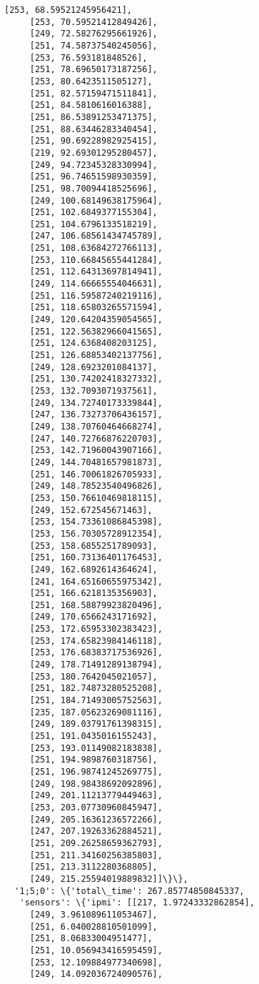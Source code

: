 \documentclass[11pt]{article}
\begin{document}
\begin{tcolorbox}[breakable, size=fbox, boxrule=.5pt, pad at break*=1mm, opacityfill=0]
\begin{Verbatim}[commandchars=\\\{\}]
     [253, 68.59521245956421],
     [253, 70.59521412849426],
     [249, 72.58276295661926],
     [251, 74.58737540245056],
     [253, 76.593181848526],
     [251, 78.69650173187256],
     [253, 80.6423511505127],
     [251, 82.57159471511841],
     [251, 84.5810616016388],
     [251, 86.53891253471375],
     [251, 88.63446283340454],
     [251, 90.69228982925415],
     [219, 92.69301295280457],
     [249, 94.72345328330994],
     [251, 96.74651598930359],
     [251, 98.70094418525696],
     [249, 100.68149638175964],
     [251, 102.6849377155304],
     [251, 104.6796133518219],
     [247, 106.68561434745789],
     [251, 108.63684272766113],
     [253, 110.66845655441284],
     [251, 112.64313697814941],
     [249, 114.66665554046631],
     [251, 116.59587240219116],
     [251, 118.65803265571594],
     [249, 120.64204359054565],
     [251, 122.56382966041565],
     [251, 124.6368408203125],
     [251, 126.68853402137756],
     [249, 128.6923201084137],
     [251, 130.74202418327332],
     [253, 132.7093071937561],
     [249, 134.72740173339844],
     [247, 136.73273706436157],
     [249, 138.70760464668274],
     [247, 140.72766876220703],
     [253, 142.71960043907166],
     [249, 144.70481657981873],
     [251, 146.70061826705933],
     [249, 148.78523540496826],
     [253, 150.76610469818115],
     [249, 152.672545671463],
     [253, 154.73361086845398],
     [253, 156.70305728912354],
     [253, 158.6855251789093],
     [251, 160.73136401176453],
     [249, 162.6892614364624],
     [241, 164.65160655975342],
     [251, 166.6218135356903],
     [251, 168.58879923820496],
     [249, 170.6566243171692],
     [253, 172.65953302383423],
     [253, 174.65823984146118],
     [253, 176.68383717536926],
     [249, 178.71491289138794],
     [253, 180.7642045021057],
     [251, 182.74873280525208],
     [251, 184.71493005752563],
     [235, 187.05623269081116],
     [249, 189.03791761398315],
     [251, 191.0435016155243],
     [253, 193.01149082183838],
     [251, 194.9898760318756],
     [251, 196.98741245269775],
     [249, 198.98438692092896],
     [249, 201.11213779449463],
     [253, 203.07730960845947],
     [249, 205.16361236572266],
     [247, 207.19263362884521],
     [251, 209.26258659362793],
     [251, 211.34160256385803],
     [251, 213.3112280368805],
     [249, 215.25594019889832]]\}\},
  '1;5;0': \{'total\_time': 267.85774850845337,
   'sensors': \{'ipmi': [[217, 1.97243332862854],
     [249, 3.961089611053467],
     [251, 6.040028810501099],
     [251, 8.06833004951477],
     [251, 10.056943416595459],
     [253, 12.109884977340698],
     [249, 14.092036724090576],

\end{Verbatim}
\end{tcolorbox}
\end{document}
